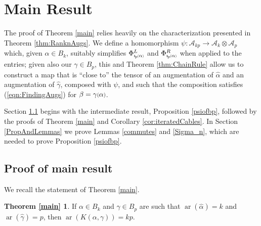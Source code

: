 \documentclass[11pt]{amsart}
\def\A{{\mathcal A}}
\def\cl{\mathcal}
\def\s{{\sigma}}
\def\ar{\operatorname{ar}}
\newcommand*{\smallp}[1]{\scalebox{.75}{\ensuremath#1}}
\newcommand*{\subsmallp}[1]{\scalebox{.5}{\ensuremath#1}}
\newcommand{\subpp}[2][p]{\imath_{\hspace*{-1pt}#1}\hspace*{-.5pt}\subsmallp(#2\subsmallp)}
\theoremstyle{definition}
\begin{document}

\section{Main Result}
\label{SecMain}

The proof of Theorem \ref{main} relies heavily on the characterization presented in Theorem \ref{thm:RanknAugs}. We define a homomorphism $\psi:\cl A_{kp}\to\cl A_k\otimes\cl A_p$ which, given $\alpha\in B_k$, suitably simplifies $\Phi_{\subpp\alpha}^L$ and $\Phi_{\subpp\alpha}^R$ when applied to the entries; given also our $\gamma\in B_p$, this and Theorem \ref{thm:ChainRule} allow us to construct a map that is ``close to'' the tensor of an augmentation of $\hat\alpha$ and an augmentation of $\hat\gamma$, composed with $\psi$, and such that the composition satisfies (\ref{eqn:FindingAugs}) for $\beta=\gamma\smallp(\alpha\smallp)$.

Section \ref{MainProof} begins with the intermediate result, Proposition \ref{psiofbp}, followed by the proofs of Theorem \ref{main} and Corollary \ref{cor:iteratedCables}.  In Section \ref{PropAndLemmas} we prove Lemmas \ref{commutes} and \ref{Sigma_n}, which are needed to prove Proposition \ref{psiofbp}.

\subsection{Proof of main result}
\label{MainProof}
We recall the statement of Theorem \ref{main}.

\newtheorem*{main}{Theorem \ref{main}}
\begin{main}
If $\alpha\in B_k$ and $\gamma\in B_p$ are such that $\ar(\hat{\alpha})=k$ and $\ar(\hat{\gamma})=p$, then $\ar(K(\alpha,\gamma))=kp$.
\end{main}

\end{document}

